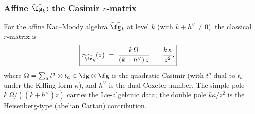 \subsubsection{Affine $\widehat{\fg}_k$: the Casimir $r$-matrix}

\begin{theorem}
For the affine Kac--Moody algebra $\widehat{\fg}_k$ at level $k$
(with $k + h^\vee \ne 0$), the classical $r$-matrix is
\begin{equation}
\boxed{
r_{\widehat{\fg}_k}(z)
\;=\;
\frac{k\,\Omega}{(k + h^\vee)\, z}
\;+\;
\frac{k\, \kappa}{z^2},
}
\end{equation}
where $\Omega = \sum_a t^a \otimes t_a \in \fg \otimes \fg$ is the
quadratic Casimir (with $t^a$ dual to $t_a$ under the Killing form
$\kappa$), and $h^\vee$ is the dual Coxeter number. The simple pole
$k\,\Omega/((k+h^\vee)z)$ carries the Lie-algebraic data; the double
pole $k\kappa/z^2$ is the Heisenberg-type (abelian Cartan)
contribution.
\end{theorem}

